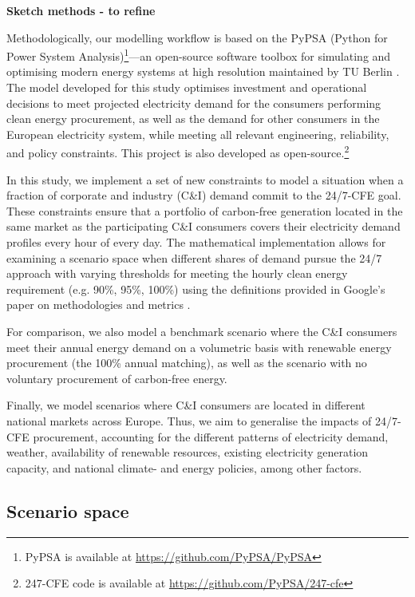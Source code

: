 \textbf{Sketch methods - to refine}

Methodologically, our modelling workflow is based on the PyPSA (Python for Power System Analysis)\footnote{PyPSA is available at \url{https://github.com/PyPSA/PyPSA}}—an open-source software toolbox for simulating and optimising modern energy systems at high resolution maintained by TU Berlin \cite{brownPyPSAPythonPower2018,horschPyPSAEurOpenOptimisation2018}. 
The model developed for this study optimises investment and operational decisions to meet projected electricity demand for the consumers performing clean energy procurement, as well as the demand for other consumers in the European electricity system, while meeting all relevant engineering, reliability, and policy constraints. 
This project is also developed as open-source.\footnote{247-CFE code is available at  \url{https://github.com/PyPSA/247-cfe}}

In this study, we implement a set of new constraints to model a situation when a fraction of corporate and industry (C\&I) demand commit to the 24/7-CFE goal. 
These constraints ensure that a portfolio of carbon-free generation located in the same market as the participating C\&I consumers covers their electricity demand profiles every hour of every day. 
The mathematical implementation allows for examining a scenario space when different shares of demand pursue the 24/7 approach with varying thresholds for meeting the hourly clean energy requirement (e.g. 90\%, 95\%, 100\%) using the definitions provided in Google's paper on methodologies and metrics \cite{google-methodologies}.

For comparison, we also model a benchmark scenario where the C\&I consumers meet their annual energy demand on a volumetric basis with renewable energy procurement (the 100\% annual matching), as well as the scenario with no voluntary procurement of carbon-free energy.

Finally, we model scenarios where C\&I consumers are located in different national markets across Europe. 
Thus, we aim to generalise the impacts of 24/7-CFE procurement, accounting for the different patterns of electricity demand, weather, availability of renewable resources, existing electricity generation capacity, and national climate- and energy policies, among other factors.

\subsection{Scenario space}
\label{subsec:scenarios}

